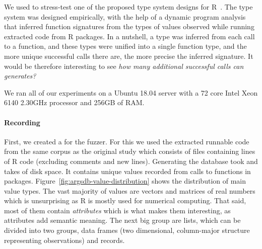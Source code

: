 \documentclass[sigplan,anonymous,review]{acmart}
\begin{document}
We used \tool to stress-test one of the proposed type system designs for R~\cite{turcotte2020designing}.
The type system was designed empirically, with the help of a dynamic program analysis that inferred function signatures from the types of values observed while running extracted code from R packages.
In a nutshell, a type was inferred from each call to a function, and these types were unified into a single function type, and the more unique successful calls there are, the more precise the inferred signature.
It would be therefore interesting to see \emph{how many additional successful calls can \tool generates?}

We ran all of our experiments on a Ubuntu 18.04 server with a 72 core Intel Xeon 6140 2.30GHz processor and 256GB of RAM. 

\paragraph{Recording}

First, we created a \sxpdb for the fuzzer.
For this we used the extracted runnable code from the same corpus as the original study which consists of \DBNumSourceFiles files containing \DBSourceLinesOfCodeRnd lines of R code (excluding comments and new lines).
Generating the database took  and takes \DBFileSize of disk space.
It contains \DBValuesRnd unique values recorded from \DBNumCallsRnd calls to \DBNumFunctionsRnd functions in \DBNumPackages packages.
Figure~\ref{fig:argsdb-value-distribution} shows the distribution of main value types.
The vast majority of values are vectors and matrices of real numbers which is unsurprising as R is mostly used for numerical computing.
That said, most of them  contain \textit{attributes} which is what makes them interesting, as attributes add semantic meaning.
The next big group are lists, which can be divided into two groups, data frames (two dimensional, column-major structure representing observations) and records.
\end{document}
